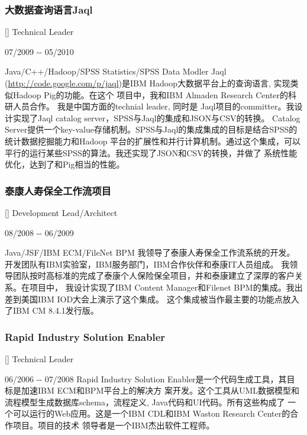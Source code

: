 \documentclass[a4paper]{article}
\newenvironment{DUlineblock}[1]{%
    \list{}{\setlength{\partopsep}{\parskip}
            \addtolength{\partopsep}{\baselineskip}
            \setlength{\topsep}{0pt}
            \setlength{\itemsep}{0.15\baselineskip}
            \setlength{\parsep}{0pt}
            \setlength{\leftmargin}{#1}}
    \raggedright
  }
  {\endlist}
\begin{document}
\begin{CJK}{UTF8}{gkai}
\subsubsection*{大数据查询语言Jaql}
\begin{DUlineblock}{0em}
\item[] Technical Leader
\item[] 07/2009 -{}- 05/2010
\item[] Java/C++/Hadoop/SPSS Statistics/SPSS Data Modler
\end{DUlineblock}
Jaql (\url{http://code.google.com/p/jaql})是IBM Hadoop大数据平台上的查询语言, 实现类似Hadoop Pig的功能。在这个
项目中，我和IBM Almaden Research Center的科研人员合作。 我是中国方面的technial leader, 同时是
Jaql项目的committer。我设计实现了Jaql catalog server，SPSS与Jaql的集成和JSON与CSV的转换。
Catalog Server提供一个key-value存储机制。SPSS与Jaql的集成集成的目标是结合SPSS的统计数据挖掘能力和Hadoop
平台的扩展性和并行计算机制。通过这个集成，可以平行的运行某些SPSS的算法。我还实现了JSON和CSV的转换，并做了
系统性能优化，达到了和Pig相当的性能。


\subsubsection*{泰康人寿保全工作流项目}
\begin{DUlineblock}{0em}
\item[] Development Lead/Architect
\item[] 08/2008 -{}- 06/2009
\item[] Java/JSF/IBM ECM/FileNet BPM
\end{DUlineblock}
我领导了泰康人寿保全工作流系统的开发。开发团队有IBM实验室，IBM服务部门，IBM合作伙伴和泰康IT人员组成。
我领导团队按时高标准的完成了泰康个人保险保全项目，并和泰康建立了深厚的客户关系。在项目中，
我设计实现了IBM Content Manager和Filenet BPM的集成。我出差到美国IBM IOD大会上演示了这个集成。
这个集成被当作最主要的功能点放入了IBM CM 8.4.1发行版。

\subsubsection*{Rapid Industry Solution Enabler}
\begin{DUlineblock}{0em}
\item[] Technical Leader
\item[] 06/2006 -{}- 07/2008
\end{DUlineblock}
Rapid Industry Solution Enabler是一个代码生成工具，其目标是加速IBM ECM和BPM平台上的解决方
案开发。这个工具从UML数据模型和流程模型生成数据库schema，流程定义, Java代码和UI代码。所有这些构成了
一个可以运行的Web应用。这是一个IBM CDL和IBM Waston Research Center的合作项目。项目的技术
领导者是一个IBM杰出软件工程师。


\end{CJK}
\end{document}
